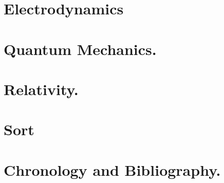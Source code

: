 \part{Electrodynamics}



\part{Quantum Mechanics.}












\part{Relativity.}










\part{Sort}






\part{Chronology and Bibliography.}

